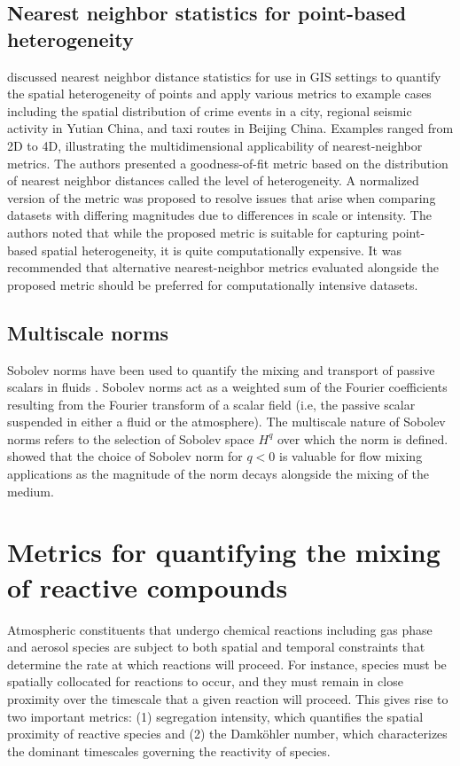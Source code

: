 \subsection{Nearest neighbor statistics for point-based heterogeneity}
\textcite{shu_quantifying_2019} discussed nearest neighbor distance statistics for use in GIS settings to quantify the spatial heterogeneity of points and apply various metrics to example cases including the spatial distribution of crime events in a city, regional seismic activity in Yutian China, and taxi routes in Beijing China.  Examples ranged from 2D to 4D, illustrating the multidimensional applicability of nearest-neighbor metrics. The authors presented a goodness-of-fit metric based on the distribution of nearest neighbor distances called the level of heterogeneity. A normalized version of the metric was proposed to resolve issues that arise when comparing datasets with differing magnitudes due to differences in scale or intensity. The authors noted that while the proposed metric is suitable for capturing point-based spatial heterogeneity, it is quite computationally expensive. It was recommended that alternative nearest-neighbor metrics evaluated alongside the proposed metric should be preferred for computationally intensive datasets. 

\subsection{Multiscale norms}
Sobolev norms have been used to quantify the mixing and transport of passive scalars in fluids \parencite{thiffeault_using_2012}. Sobolev norms act as a weighted sum of the Fourier coefficients resulting from the Fourier transform of a scalar field (i.e, the passive scalar suspended in either a fluid or the atmosphere). The multiscale nature of Sobolev norms refers to the selection of Sobolev space $H^q$ over which the norm is defined. \textcite{thiffeault_using_2012} showed that the choice of Sobolev norm for $q<0$ is valuable for flow mixing applications as the magnitude of the norm decays alongside the mixing of the medium.

\section{Metrics for quantifying the mixing of reactive compounds}\label{metrics-reactive-mixing}
Atmospheric constituents that undergo chemical reactions including gas phase and aerosol species are subject to both spatial and temporal constraints that determine the rate at which reactions will proceed. For instance, species must be spatially collocated for reactions to occur, and they must remain in close proximity over the timescale that a given reaction will proceed. This gives rise to two important metrics: (1) segregation intensity, which quantifies the spatial proximity of reactive species and (2) the Damköhler number, which characterizes the dominant timescales governing the reactivity of species.

